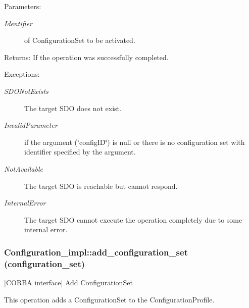\begin{Desc}
\item[Parameters:]
\begin{description}
\item[{\em Identifier}]of Configuration\-Set to be activated. \end{description}
\end{Desc}
\begin{Desc}
\item[Returns:]If the operation was successfully completed. \end{Desc}
\begin{Desc}
\item[Exceptions:]
\begin{description}
\item[{\em SDONot\-Exists}]The target SDO does not exist. \item[{\em Invalid\-Parameter}]if the argument (\char`\"{}config\-ID\char`\"{}) is null or there is no configuration set with identifier specified by the argument. \item[{\em Not\-Available}]The target SDO is reachable but cannot respond. \item[{\em Internal\-Error}]The target SDO cannot execute the operation completely due to some internal error.\end{description}
\end{Desc}
\subsubsection{\setlength{\rightskip}{0pt plus 5cm}Configuration\_\-impl::add\_\-configuration\_\-set (configuration\_\-set)}\label{classConfiguration__impl_Configuration__impla14}


[CORBA interface] Add Configuration\-Set 

This operation adds a Configuration\-Set to the Configuration\-Profile.

